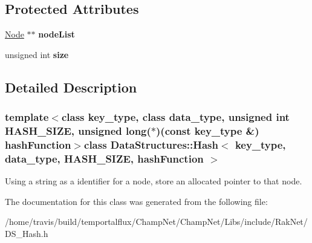 \subsection*{Protected Attributes}
\begin{DoxyCompactItemize}
\item 
\hypertarget{class_data_structures_1_1_hash_acf5c56373cc49f871f3ca93aa7c93984}{\hyperlink{struct_data_structures_1_1_hash_1_1_node}{Node} $\ast$$\ast$ {\bfseries node\-List}}\label{class_data_structures_1_1_hash_acf5c56373cc49f871f3ca93aa7c93984}

\item 
\hypertarget{class_data_structures_1_1_hash_a3affcd7d2939cb81c9ec5daef841303e}{unsigned int {\bfseries size}}\label{class_data_structures_1_1_hash_a3affcd7d2939cb81c9ec5daef841303e}

\end{DoxyCompactItemize}


\subsection{Detailed Description}
\subsubsection*{template$<$class key\-\_\-type, class data\-\_\-type, unsigned int H\-A\-S\-H\-\_\-\-S\-I\-Z\-E, unsigned long($\ast$)(const key\-\_\-type \&) hash\-Function$>$class Data\-Structures\-::\-Hash$<$ key\-\_\-type, data\-\_\-type, H\-A\-S\-H\-\_\-\-S\-I\-Z\-E, hash\-Function $>$}

Using a string as a identifier for a node, store an allocated pointer to that node. 

The documentation for this class was generated from the following file\-:\begin{DoxyCompactItemize}
\item 
/home/travis/build/temportalflux/\-Champ\-Net/\-Champ\-Net/\-Libs/include/\-Rak\-Net/D\-S\-\_\-\-Hash.\-h\end{DoxyCompactItemize}
